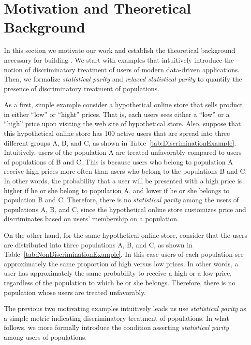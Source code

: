 \section{Motivation and Theoretical Background}
\label{sect:motivation}

In this section we motivate our work and establish the theoretical
background necessary for building \sysname. We start with examples
that intuitively  introduce the notion of discriminatory treatment
of users of modern data-driven applications. Then, we formalize 
{\em statistical parity} and {\em relaxed statistical parity} to
quantify the presence of discriminatory treatment of populations.

As a first, simple example consider a hypothetical  online store that
sells product in either ``low'' or ``hight'' prices. That is, each
users sees either a ``low'' or a ``high'' price upon visiting the web
site of hypothetical store. Also, suppose that this hypothetical online
store has 100 active users that are spread into three different groups
A, B, and C, as shown in Table~\ref{tab:DiscriminationExample}.
Intuitively, users of
the population A are treated unfavorably compared to users of populations
of B and C. This is because users who belong to population A receive high
prices more often than users who belong to the populations B and C. In other
words, the probability that a user will be presented with a high price is
higher if he or she belong to population A, and lower if he or she belongs to
population B and C. Therefore, there is no {\em statistical parity} among the
users of populations A, B, and C, since the hypothetical online store
customizes price and discriminates based on users' membership on a population.

On the other hand, for the same hypothetical online store, consider
that the users are distributed into three populations A, B, and C, as
shown in Table~\ref{tab:NonDiscriminationExample}. In this case
users of each population see approximately the same proportion of high versus
low prices. In other words, a user has approximately the same probability to
receive a high or a low price, regardless of the population to which he or she
belongs. Therefore, there is no population whose users are treated unfavorably.

The previous two motivating examples intuitively leads us use {\em statistical
parity} as a simple metric indicating discriminatory treatment of populations.
In what follows, we more formally introduce the condition asserting
{\em statistical parity} among users of populations.


